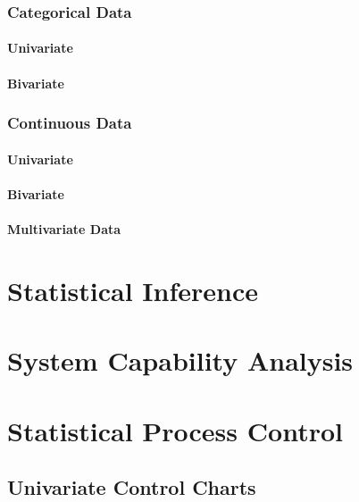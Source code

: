 \documentclass[12pt,a4paper]{report}
\begin{document}
\subsection{Categorical Data}

\subsubsection{Univariate}

\subsubsection{Bivariate}


\subsection{Continuous Data}

\subsubsection{Univariate}


\subsubsection{Bivariate}

\subsubsection{Multivariate Data}





\chapter{Statistical Inference} 



\chapter{System Capability Analysis}




\chapter{Statistical Process Control}
\section{Univariate Control Charts}
\end{document}
